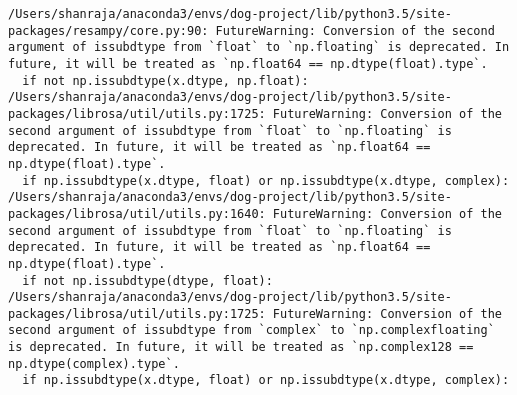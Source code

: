 \documentclass[11pt]{article}
\begin{document}
    \begin{Verbatim}[commandchars=\\\{\}]
/Users/shanraja/anaconda3/envs/dog-project/lib/python3.5/site-packages/resampy/core.py:90: FutureWarning: Conversion of the second argument of issubdtype from `float` to `np.floating` is deprecated. In future, it will be treated as `np.float64 == np.dtype(float).type`.
  if not np.issubdtype(x.dtype, np.float):
/Users/shanraja/anaconda3/envs/dog-project/lib/python3.5/site-packages/librosa/util/utils.py:1725: FutureWarning: Conversion of the second argument of issubdtype from `float` to `np.floating` is deprecated. In future, it will be treated as `np.float64 == np.dtype(float).type`.
  if np.issubdtype(x.dtype, float) or np.issubdtype(x.dtype, complex):
/Users/shanraja/anaconda3/envs/dog-project/lib/python3.5/site-packages/librosa/util/utils.py:1640: FutureWarning: Conversion of the second argument of issubdtype from `float` to `np.floating` is deprecated. In future, it will be treated as `np.float64 == np.dtype(float).type`.
  if not np.issubdtype(dtype, float):
/Users/shanraja/anaconda3/envs/dog-project/lib/python3.5/site-packages/librosa/util/utils.py:1725: FutureWarning: Conversion of the second argument of issubdtype from `complex` to `np.complexfloating` is deprecated. In future, it will be treated as `np.complex128 == np.dtype(complex).type`.
  if np.issubdtype(x.dtype, float) or np.issubdtype(x.dtype, complex):

    \end{Verbatim}
\end{document}
